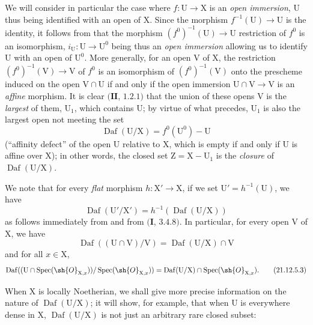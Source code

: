 \begin{env}[21.12.5]
\label{IV.21.12.5}
We will consider in particular the case where $f:\mathrm{U}\to\mathrm{X}$ is an \emph{open immersion}, $\mathrm{U}$ thus being identified with an open of $\mathrm{X}$.
Since the morphism $f^{-1}(\mathrm{U})\to\mathrm{U}$ is the identity, it follows from  that the morphism $(f^0)^{-1}(\mathrm{U})\to\mathrm{U}$ restriction of $f^0$ is an isomorphism, $i_{\mathrm{U}}:\mathrm{U}\to\mathrm{U}^0$ being thus an \emph{open immersion} allowing us to identify $\mathrm{U}$ with an open of $\mathrm{U}^0$.
More generally, for an open $\mathrm{V}$ of $\mathrm{X}$, the restriction $(f^0)^{-1}(\mathrm{V})\to\mathrm{V}$ of $f^0$ is an isomorphism of $(f^0)^{-1}(\mathrm{V})$ onto the prescheme induced on the open $\mathrm{V}\cap\mathrm{U}$ if and only if the open immersion $\mathrm{U}\cap\mathrm{V}\to\mathrm{V}$ is an \emph{affine} morphism.
It is clear $(\mathbf{II}$, $1.2.1)$
that the union of these opens $\mathrm{V}$ is the \emph{largest} of them, $\mathrm{U}_1$, which contains $\mathrm{U}$; by virtue of what precedes, $\mathrm{U}_1$ is also the largest open not meeting the set
\[
  \operatorname{Daf}(\mathrm{U}/\mathrm{X})=f^0(\mathrm{U}^0)-\mathrm{U}
\]
(``affinity defect'' of the open $\mathrm{U}$ relative to $\mathrm{X}$, which is empty if and only if $\mathrm{U}$ is affine over $\mathrm{X}$); in other words, the closed set $\mathrm{Z}=\mathrm{X}-\mathrm{U}_1$ is the \emph{closure} of $\operatorname{Daf}(\mathrm{U}/\mathrm{X})$.

We note that for every \emph{flat} morphism $h:\mathrm{X}'\to\mathrm{X}$, if we set $\mathrm{U}'=h^{-1}(\mathrm{U})$, we have
\[
\label{IV.21.12.5.1}
  \operatorname{Daf}(\mathrm{U}'/\mathrm{X}')=h^{-1}(\operatorname{Daf}(\mathrm{U}/\mathrm{X}))
  \tag{21.12.5.1}
\]
as follows immediately from  and from $(\mathbf{I}$, $3.4.8)$.
In particular, for every open $\mathrm{V}$ of $\mathrm{X}$, we have
\[
\label{IV.21.12.5.2}
  \operatorname{Daf}((\mathrm{U}\cap\mathrm{V})/\mathrm{V})=\operatorname{Daf}(\mathrm{U}/\mathrm{X})\cap\mathrm{V}
  \tag{21.12.5.2}
\]
and for all $x\in\mathrm{X}$,
\[
\label{IV.21.12.5.3}
  \operatorname{Daf}((\mathrm{U}\cap\operatorname{Spec}(\sh{O}_{\mathrm{X},x}))/\operatorname{Spec}(\sh{O}_{\mathrm{X},x}))=\operatorname{Daf}(\mathrm{U}/\mathrm{X})\cap\operatorname{Spec}(\sh{O}_{\mathrm{X},x}).
  \tag{21.12.5.3}
\]
\end{env}

When $\mathrm{X}$ is locally Noetherian, we shall give more precise information on the nature of $\operatorname{Daf}(\mathrm{U}/\mathrm{X})$; it will show, for example, that when $\mathrm{U}$ is everywhere dense in $\mathrm{X}$, $\operatorname{Daf}(\mathrm{U}/\mathrm{X})$ is not just an arbitrary rare closed subset:

